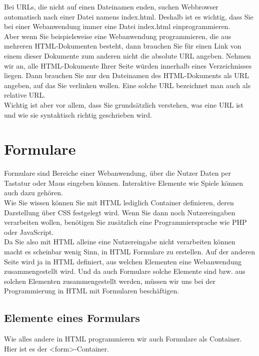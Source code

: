 Bei URLs, die nicht auf einen Dateinamen enden, suchen Webbrowser automatisch nach einer Datei namens index.html. Deshalb ist es wichtig, dass Sie bei einer Webanwendung immer eine Datei index.html einprogrammieren.\\

Aber wenn Sie beispielsweise eine Webanwendung programmieren, die aus mehreren HTML-Dokumenten besteht, dann brauchen Sie für einen Link von einem dieser Dokumente zum anderen nicht die absolute URL angeben. Nehmen wir an, alle HTML-Dokumente Ihrer Seite würden innerhalb eines Verzeichnisses liegen. Dann brauchen Sie nur den Dateinamen des HTML-Dokuments als URL angeben, auf das Sie verlinken wollen. Eine solche URL bezeichnet man auch als relative URL.\\

Wichtig ist aber vor allem, dass Sie grundsätzlich verstehen, was eine URL ist und wie sie syntaktisch richtig geschrieben wird.

\section{Formulare}

Formulare sind Bereiche einer Webanwendung, über die Nutzer Daten per Tastatur oder Maus eingeben können. Interaktive Elemente wie Spiele können auch dazu gehören.\\

Wie Sie wissen können Sie mit HTML lediglich Container definieren, deren Darstellung über CSS festgelegt wird. Wenn Sie dann noch Nutzereingaben verarbeiten wollen, benötigen Sie zusätzlich eine Programmiersprache wie PHP oder JavaScript.\\

Da Sie also mit HTML alleine eine Nutzereingabe nicht verarbeiten können macht es scheinbar wenig Sinn, in HTML Formulare zu erstellen. Auf der anderen Seite wird ja in HTML definiert, aus welchen Elementen eine Webanwendung zusammengestellt wird. Und da auch Formulare solche Elemente sind bzw. aus solchen Elementen zusammengestellt werden, müssen wir uns bei der Programmierung in HTML mit Formularen beschäftigen.

\subsection{Elemente eines Formulars}

Wie alles andere in HTML programmieren wir auch Formulare  als Container. Hier ist es der <form>-Container.\\

